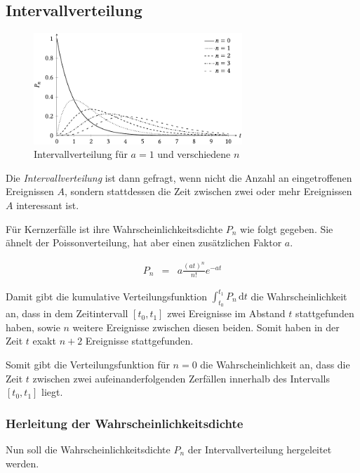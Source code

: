 \documentclass[12pt,a4paper]{scrartcl}
\numberwithin{equation}{section} %
\begin{document}
\hypertarget{Intervallverteilung}{\subsection{Intervallverteilung}\label{Intervallverteilung}}
\begin{figure}[h!]
	\centering
	\includegraphics[width=0.7\textwidth]{../media/B3.1/Intervallverteilungen.pdf}
	\caption{Intervallverteilung für $a = 1$ und verschiedene $n$ \cite{uni}}
	\label{fig:Intervallverteilung}
\end{figure}

\noindent
Die \emph{Intervallverteilung} ist dann gefragt, wenn nicht die Anzahl an eingetroffenen Ereignissen $A$, sondern stattdessen die Zeit zwischen zwei oder mehr Ereignissen $A$ interessant ist.

Für Kernzerfälle ist ihre Wahrscheinlichkeitsdichte $P_n$ wie folgt gegeben. Sie ähnelt der Poissonverteilung, hat aber einen zusätzlichen Faktor $a$.

\begin{eqnarray}
	P_n &=& a \frac{(at)^n}{n!} e^{-at} \label{eq:Intervallverteilung}
\end{eqnarray}

\noindent
Damit gibt die kumulative Verteilungsfunktion $\int_{t_0}^{t_1} P_n \,\mathrm dt \label{eq:P_n_int}$ die Wahrscheinlichkeit an, dass in dem Zeitintervall $[t_0,t_1]$ zwei Ereignisse im Abstand $t$ stattgefunden haben, sowie $n$ weitere Ereignisse zwischen diesen beiden. Somit haben in der Zeit $t$ exakt $n+2$ Ereignisse stattgefunden.

Somit gibt die Verteilungsfunktion für $n=0$ die Wahrscheinlichkeit an, dass die Zeit $t$ zwischen zwei aufeinanderfolgenden Zerfällen innerhalb des Intervalls $[t_0, t_1]$ liegt.

\hypertarget{Herleitung Intervallverteilung}{\subsubsection{Herleitung der Wahrscheinlichkeitsdichte}\label{Herleitung Intervallverteilung}}
Nun soll die Wahrscheinlichkeitsdichte $P_n$ der Intervallverteilung hergeleitet werden.
\end{document}
